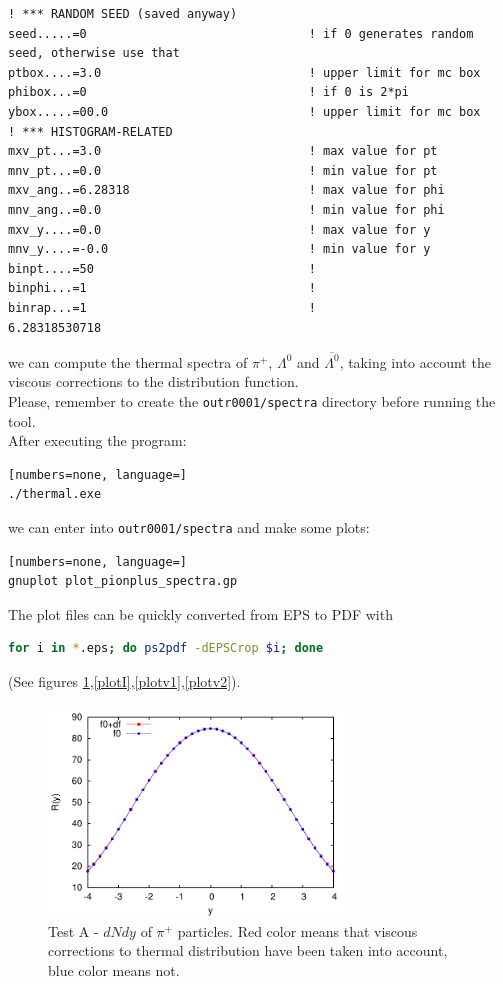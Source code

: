 \begin{lstlisting}[numbers=none]
! *** RANDOM SEED (saved anyway)
seed.....=0                               ! if 0 generates random seed, otherwise use that
ptbox....=3.0                             ! upper limit for mc box
phibox...=0                               ! if 0 is 2*pi
ybox.....=00.0                            ! upper limit for mc box
! *** HISTOGRAM-RELATED
mxv_pt...=3.0                             ! max value for pt
mnv_pt...=0.0                             ! min value for pt
mxv_ang..=6.28318                         ! max value for phi
mnv_ang..=0.0                             ! min value for phi
mxv_y....=0.0                             ! max value for y
mnv_y....=-0.0                            ! min value for y
binpt....=50                              !
binphi...=1                               !
binrap...=1                               !
6.28318530718
\end{lstlisting}
we can compute the thermal spectra of $\pi^+$, $\Lambda^0$ and $\overline{\Lambda^0}$, taking into account the viscous corrections to the distribution function.\\
Please, remember to create the {\tt outr0001/spectra} directory before running the tool.\\
After executing the program:
\begin{lstlisting}[numbers=none, language=]
./thermal.exe
\end{lstlisting}
we can enter into {\tt outr0001/spectra} and make some plots:
\begin{lstlisting}[numbers=none, language=]
gnuplot plot_pionplus_spectra.gp
\end{lstlisting}
The plot files can be quickly converted from EPS to PDF with
\begin{lstlisting}[numbers=none, language=BASH]
for i in *.eps; do ps2pdf -dEPSCrop $i; done
\end{lstlisting}
(See figures \ref{plotdNdy},\ref{plotI},\ref{plotv1},\ref{plotv2}).
\begin{figure}[!h]
 \begin{center}
  \includegraphics[width=8cm]{images/dNdy_pi_plus.pdf}
   \caption{Test A - $dNdy$ of $\pi^+$ particles. Red color means that viscous corrections to thermal distribution have been taken into account, blue color means not.}
    \label{plotdNdy}
 \end{center}
\end{figure}

